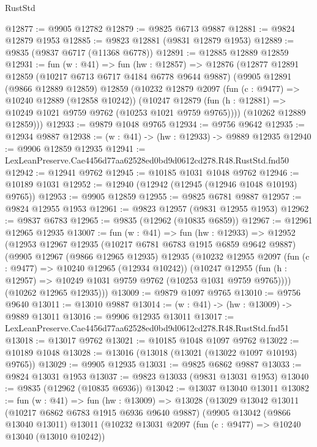 \begin{lexlean}{RustStd}
\begin{coremodule}
@12877 := @9905 @12782
@12879 := @9825 @6713 @9887
@12881 := @9824 @12879 @1953
@12885 := @9823 @12881 (@9831 @12879 @1953)
@12889 := @9835 (@9837 @6717 (@11368 @6778))
@12891 := @12885 @12889 @12859
@12931 := fun (w : @41) =>
  fun (hw : @12857) =>
  @12876
    (@12877
      @12891
      @12859
      (@10217 @6713 @6717 @4184 @6778 @9644 @9887)
      (@9905
        @12891
        (@9866 @12889 @12859)
        @12859
        (@10232
          @12879
          @2097
          (fun (c : @9477) => @10240 @12889 (@12858 @10242))
          (@10247 @12879 (fun (h : @12881) => @10249 @1021 @9759 @9762 (@10253 @1021 @9759 @9765))))
        (@10262 @12889 @12859)))
@12933 := @9879 @1048 @9765
@12934 := @9756 @9642
@12935 := @12934 @9887
@12938 := (w : @41) -> (hw : @12933) -> @9889 @12935
@12940 := @9906 @12859 @12935
@12941 := LexLeanPreserve.Cae4456d77aa62528ed0bd9d0612cd278.R48.RustStd.fnd50
@12942 := @12941 @9762
@12945 := @10185 @1031 @1048 @9762
@12946 := @10189 @1031
@12952 := @12940 (@12942 (@12945 (@12946 @1048 @10193) @9765))
@12953 := @9905 @12859
@12955 := @9825 @6781 @9887
@12957 := @9824 @12955 @1953
@12961 := @9823 @12957 (@9831 @12955 @1953)
@12962 := @9837 @6783
@12965 := @9835 (@12962 (@10835 @6859))
@12967 := @12961 @12965 @12935
@13007 := fun (w : @41) =>
  fun (hw : @12933) =>
  @12952
    (@12953
      @12967
      @12935
      (@10217 @6781 @6783 @1915 @6859 @9642 @9887)
      (@9905
        @12967
        (@9866 @12965 @12935)
        @12935
        (@10232
          @12955
          @2097
          (fun (c : @9477) => @10240 @12965 (@12934 @10242))
          (@10247 @12955 (fun (h : @12957) => @10249 @1031 @9759 @9762 (@10253 @1031 @9759 @9765))))
        (@10262 @12965 @12935)))
@13009 := @9879 @1097 @9765
@13010 := @9756 @9640
@13011 := @13010 @9887
@13014 := (w : @41) -> (hw : @13009) -> @9889 @13011
@13016 := @9906 @12935 @13011
@13017 := LexLeanPreserve.Cae4456d77aa62528ed0bd9d0612cd278.R48.RustStd.fnd51
@13018 := @13017 @9762
@13021 := @10185 @1048 @1097 @9762
@13022 := @10189 @1048
@13028 := @13016 (@13018 (@13021 (@13022 @1097 @10193) @9765))
@13029 := @9905 @12935
@13031 := @9825 @6862 @9887
@13033 := @9824 @13031 @1953
@13037 := @9823 @13033 (@9831 @13031 @1953)
@13040 := @9835 (@12962 (@10835 @6936))
@13042 := @13037 @13040 @13011
@13082 := fun (w : @41) =>
  fun (hw : @13009) =>
  @13028
    (@13029
      @13042
      @13011
      (@10217 @6862 @6783 @1915 @6936 @9640 @9887)
      (@9905
        @13042
        (@9866 @13040 @13011)
        @13011
        (@10232
          @13031
          @2097
          (fun (c : @9477) => @10240 @13040 (@13010 @10242))

\end{coremodule}
\end{lexlean}

